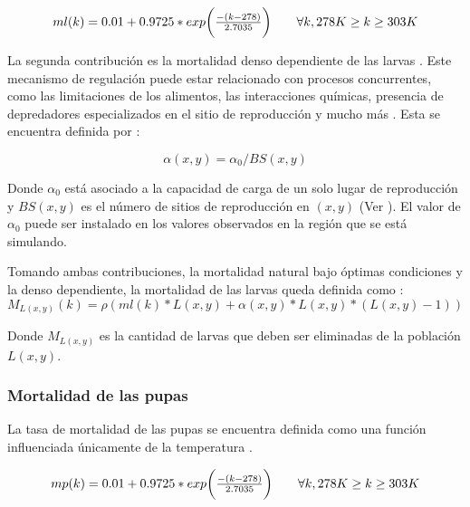 \begin{equation}
\label{eq:mortalidad-natural-larvas}
 \begin{array}{l l}
    ml(k) = 0.01 + 0.9725 * exp\bigg( \frac{-(k - 278)}{2.7035}\bigg) &\quad  \forall k, 278 K \geq k \geq 303 K\\
\end{array}
\end{equation}

La segunda contribución es la mortalidad denso dependiente de las larvas \cite{otero2006stochastic}
. Este mecanismo de regulación puede estar relacionado con procesos concurrentes, como las
limitaciones de los alimentos, las interacciones químicas, presencia de depredadores
especializados en el sitio de reproducción y mucho más \cite{otero2006stochastic}. Esta se
encuentra definida por :

\begin{equation}
  \alpha (x,y) = \alpha _{0}/BS(x,y)
\end{equation}

Donde $\alpha _{0}$ está asociado a la capacidad de carga de un solo lugar de reproducción y
$BS(x,y)$ es el número de sitios de reproducción en $(x,y)$ (Ver
). El valor de $\alpha _{0}$ puede ser instalado en los
valores observados en la región que se está simulando.

Tomando ambas contribuciones, la mortalidad natural bajo óptimas condiciones y la denso
dependiente, la mortalidad de las larvas queda definida como :
\begin{equation}
    M_{L(x,y)}(k) = \rho(ml(k) * L(x,y) + \alpha (x,y) * L(x,y) *(L(x,y) - 1))
\end{equation}

Donde $M_{L(x,y)}$ es la cantidad de larvas que deben ser eliminadas de la población $L(x,y)$.

\subsubsection{Mortalidad de las pupas}
La tasa de mortalidad de las pupas se encuentra definida como una función influenciada únicamente
de la temperatura \cite{otero2006stochastic}.

\begin{equation}
\label{eq:mortalidad-natural-pupas}
 \begin{array}{l l}
    mp(k) = 0.01 + 0.9725 * exp\bigg( \frac{-(k - 278)}{2.7035}\bigg) &\quad  \forall k, 278 K \geq k \geq 303 K\\
\end{array}
\end{equation}

